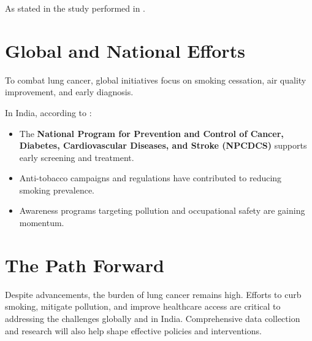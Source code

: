 As stated in the study performed in \cite{akhtar2017risk}.

\section{Global and National Efforts}
\begin{remark}
To combat lung cancer, global initiatives focus on smoking cessation, air quality improvement, and early diagnosis. 
\end{remark}
In India, according to \cite{leiter2023global}:
\begin{highlight}
\begin{itemize}
    \item The \textbf{National Program for Prevention and Control of Cancer, Diabetes, Cardiovascular Diseases, and Stroke (NPCDCS)} supports early screening and treatment.
    \item Anti-tobacco campaigns and regulations have contributed to reducing smoking prevalence.
    \item Awareness programs targeting pollution and occupational safety are gaining momentum.
\end{itemize}
\end{highlight}

\section{The Path Forward}
\begin{remark}
Despite advancements, the burden of lung cancer remains high. Efforts to curb smoking, mitigate pollution, and improve healthcare access are critical to addressing the challenges globally and in India. Comprehensive data collection and research will also help shape effective policies and interventions.
\end{remark}